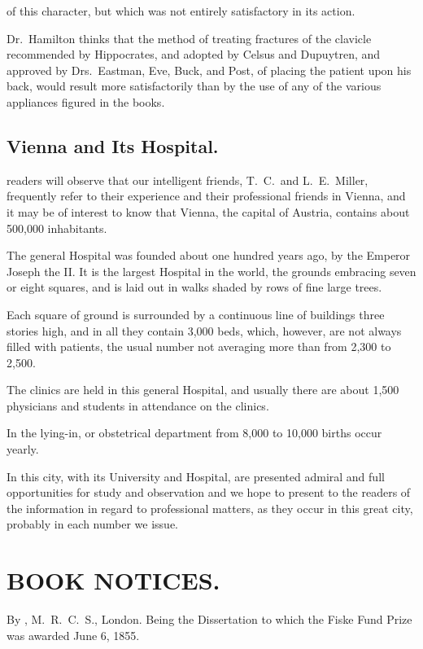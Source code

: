 of this character, but which was not entirely satisfactory in its
action.

Dr.\ Hamilton thinks that the method of treating fractures of the clavicle
recommended by Hippocrates, and adopted by Celsus and Dupuytren,
and approved by Drs.~Eastman, Eve, Buck, and Post, of placing the
patient upon his back, would result more satisfactorily than by the use
of any of the various appliances figured in the books.

\smallornament
\section*{Vienna and Its Hospital.}

 readers will observe that our intelligent friends,  T.~C.\ and
L.~E.\ Miller, frequently refer to their experience and their professional
friends in Vienna, and it may be of interest to know that Vienna, the
capital of Austria, contains about 500,000 inhabitants.

The general Hospital was founded about one hundred years ago, by
the Emperor Joseph the II. It is the largest Hospital in the world,
the grounds embracing seven or eight squares, and is laid out in walks
shaded by rows of fine large trees.

Each square of ground is surrounded by a continuous line of buildings
three stories high, and in all they contain 3,000 beds, which, however,
are not always filled with patients, the usual number not averaging
more than from 2,300 to 2,500.

The clinics are held in this general Hospital, and usually there are
about 1,500 physicians and students in attendance on the clinics.

In the lying-in, or obstetrical department from 8,000 to 10,000 births
occur yearly.

In this city, with its University and Hospital, are presented admiral
and full opportunities for study and observation and we hope to present
to the readers of the  information in regard to
professional matters, as they occur in this great city, probably in each
number we issue.

\arrowbulletornament
\chapter*[Book Notices.]{BOOK NOTICES.}

\footnotesize
{}  By , M.~R.~C.~S., London. Being the Dissertation to which the Fiske Fund Prize was awarded June 6, 1855.

